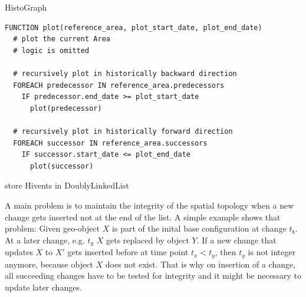 
HistoGraph
\begin{lstlisting}[language=pseudocode,
  caption=plotting Areas on the HistoGraph,
  label=lst:histograph_plot]
FUNCTION plot(reference_area, plot_start_date, plot_end_date)
  # plot the current Area
  # logic is omitted

  # recursively plot in historically backward direction
  FOREACH predecessor IN reference_area.predecessors
    IF predecessor.end_date >= plot_start_date
      plot(predecessor)

  # recursively plot in historically forward direction
  FOREACH successor IN reference_area.successors
    IF successor.start_date <= plot_end_date
      plot(successor)
\end{lstlisting}

store Hivents in DoublyLinkedList



A main problem is to maintain the integrity of the spatial topology when a new change gets inserted not at the end of the list. A simple example shows that problem: Given geo-object $X$ is part of the inital base configuration at change $t_b$. At a later change, e.g. $t_y$ $X$ gets replaced by object $Y$. If a new change that updates $X$ to $X'$ gets inserted before at time point $t_x < t_y$, then $t_y$ is not integer anymore, because object $X$ does not exist. That is why on insertion of a change, all succeeding changes have to be tested for integrity and it might be necessary to update later changes.



